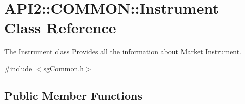 \hypertarget{class_a_p_i2_1_1_c_o_m_m_o_n_1_1_instrument}{\section{A\-P\-I2\-:\-:C\-O\-M\-M\-O\-N\-:\-:Instrument Class Reference}
\label{class_a_p_i2_1_1_c_o_m_m_o_n_1_1_instrument}
}


The \hyperlink{class_a_p_i2_1_1_c_o_m_m_o_n_1_1_instrument}{Instrument} class Provides all the information about Market \hyperlink{class_a_p_i2_1_1_c_o_m_m_o_n_1_1_instrument}{Instrument}.  




{\ttfamily \#include $<$sg\-Common.\-h$>$}

\subsection*{Public Member Functions}
